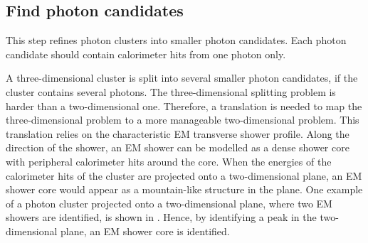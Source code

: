 \subsection{Find photon candidates}
\label{sec:photonCandiate}

This step refines photon clusters into smaller photon candidates. Each photon candidate should contain calorimeter hits from one photon only.

A three-dimensional cluster is split into several smaller photon candidates, if the cluster contains several photons. The three-dimensional splitting problem is harder than a two-dimensional one. Therefore, a translation is needed to map the three-dimensional problem to a more manageable two-dimensional problem. This translation relies on the characteristic EM transverse shower profile. Along the direction of the shower, an EM shower can be modelled as a dense shower core with peripheral calorimeter hits around the core. When the energies of the calorimeter hits of the cluster are projected onto a two-dimensional plane, an EM shower core would appear as a mountain-like structure in the plane. One example of a photon cluster projected onto a two-dimensional plane, where two EM showers are identified, is shown in . Hence, by identifying a peak in the two-dimensional plane, an EM shower core is identified.





